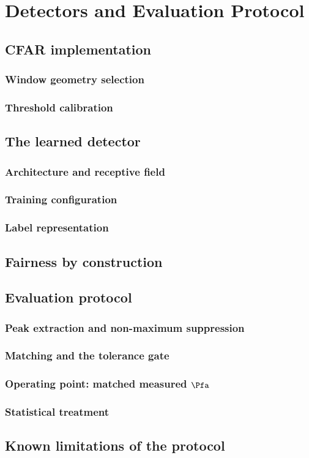 \chapter{Detectors and Evaluation Protocol}
\label{ch:detectors}

\section{CFAR implementation}
\subsection{Window geometry selection}
\subsection{Threshold calibration}

\section{The learned detector}
\subsection{Architecture and receptive field}
\subsection{Training configuration}
\subsection{Label representation}

\section{Fairness by construction}

\section{Evaluation protocol}
\subsection{Peak extraction and non-maximum suppression}
\subsection{Matching and the tolerance gate}
\subsection{Operating point: matched measured $\Pfa$}
\subsection{Statistical treatment}

\section{Known limitations of the protocol}
